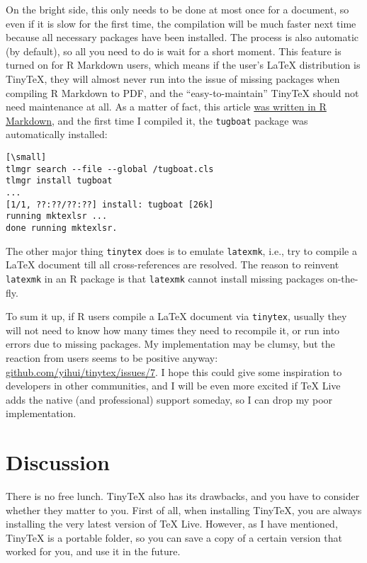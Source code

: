 \documentclass{tugboat}
\def\tinytex{\texttt{tinytex}}
\begin{document}
On the bright side, this only needs to be done at most once for a
document, so even if it is slow for the first time, the compilation will
be much faster next time because all necessary packages have been
installed. The process is also automatic (by default), so all you need
to do is wait for a short moment. This feature is turned on for R
Markdown \cite{R-rmarkdown} users, which means if the user's \LaTeX{}
distribution is TinyTeX, they will almost never run into the issue of
missing packages when compiling R Markdown to PDF, and the
``easy-to-maintain'' TinyTeX should not need maintenance at all. As a
matter of fact, this article
\href{https://github.com/yihui/tinytex/blob/master/TUGboat/tinytex.Rmd}{was
written in R Markdown}, and the first time I compiled it, the
\texttt{tugboat} package was automatically installed:

\begin{verbatim}[\small]
tlmgr search --file --global /tugboat.cls
tlmgr install tugboat
...
[1/1, ??:??/??:??] install: tugboat [26k]
running mktexlsr ...
done running mktexlsr.
\end{verbatim}

The other major thing \tinytex{} does is to emulate
\texttt{latexmk}, i.e., try to compile a \LaTeX{} document till all
cross-references are resolved. The reason to reinvent \texttt{latexmk}
in an R package is that \texttt{latexmk} cannot install missing packages
on-the-fly.

To sum it up, if R users compile a \LaTeX{} document via \tinytex{},
usually they will not need to know how many times they need to recompile
it, or run into errors due to missing packages. My implementation may be
clumsy, but the reaction from users seems to be positive anyway:
\url{github.com/yihui/tinytex/issues/7}. I hope this could give
some inspiration to developers in other communities, and I will be even
more excited if \TeX{} Live adds the native (and professional) support
someday, so I can drop my poor implementation.

\hypertarget{discussion}{%
\section{Discussion}\label{discussion}}

There is no free lunch. TinyTeX also has its drawbacks, and you have to
consider whether they matter to you. First of all, when installing
TinyTeX, you are always installing the very latest version of \TeX{} Live.
However, as I have mentioned, TinyTeX is a portable folder, so you can
save a copy of a certain version that worked for you, and use it in the
future.
\end{document}
